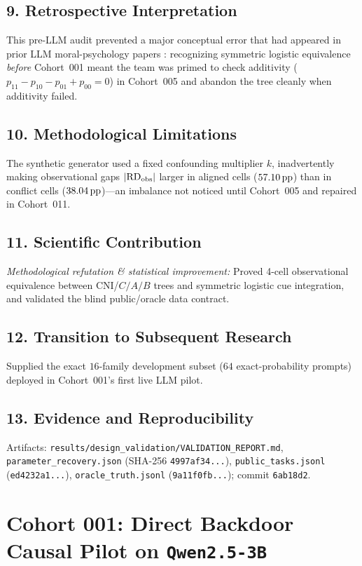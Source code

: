 \subsection*{9. Retrospective Interpretation}
This pre-LLM audit prevented a major conceptual error that had appeared in prior LLM moral-psychology papers \citep{wuDeng2025counts}: recognizing symmetric logistic equivalence \emph{before} Cohort~001 meant the team was primed to check additivity ($p_{11}-p_{10}-p_{01}+p_{00}=0$) in Cohort~005 and abandon the tree cleanly when additivity failed.

\subsection*{10. Methodological Limitations}
The synthetic generator used a fixed confounding multiplier $k$, inadvertently making observational gaps $|\mathrm{RD}_{\mathrm{obs}}|$ larger in aligned cells ($57.10\,\mathrm{pp}$) than in conflict cells ($38.04\,\mathrm{pp}$)---an imbalance not noticed until Cohort~005 and repaired in Cohort~011.

\subsection*{11. Scientific Contribution}
\emph{Methodological refutation \& statistical improvement:} Proved 4-cell observational equivalence between CNI/$C/A/B$ trees and symmetric logistic cue integration, and validated the blind public/oracle data contract.

\subsection*{12. Transition to Subsequent Research}
Supplied the exact $16$-family development subset ($64$ exact-probability prompts) deployed in Cohort~001's first live LLM pilot.

\subsection*{13. Evidence and Reproducibility}
Artifacts: \texttt{results/design\_validation/VALIDATION\_REPORT.md}, \texttt{parameter\_recovery.json} (SHA-256 \texttt{4997af34...}), \texttt{public\_tasks.jsonl} (\texttt{ed4232a1...}), \texttt{oracle\_truth.jsonl} (\texttt{9a11f0fb...}); commit \texttt{6ab18d2}.

\section{Cohort 001: Direct Backdoor Causal Pilot on \texttt{Qwen2.5-3B}}

